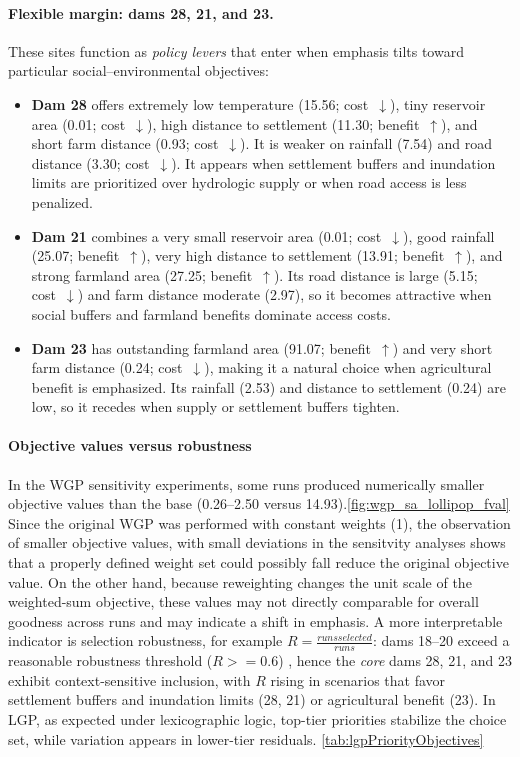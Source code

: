 \paragraph{Flexible margin: dams 28, 21, and 23.}
These sites function as \textit{policy levers} that enter when emphasis tilts toward particular social--environmental objectives:
\begin{itemize}
\item \textbf{Dam 28} offers extremely low temperature (15.56; cost~$\downarrow$), tiny reservoir area (0.01; cost~$\downarrow$), high distance to settlement (11.30; benefit~$\uparrow$), and short farm distance (0.93; cost~$\downarrow$). It is weaker on rainfall (7.54) and road distance (3.30; cost~$\downarrow$). It appears when settlement buffers and inundation limits are prioritized over hydrologic supply or when road access is less penalized.
\item \textbf{Dam 21} combines a very small reservoir area (0.01; cost~$\downarrow$), good rainfall (25.07; benefit~$\uparrow$), very high distance to settlement (13.91; benefit~$\uparrow$), and strong farmland area (27.25; benefit~$\uparrow$). Its road distance is large (5.15; cost~$\downarrow$) and farm distance moderate (2.97), so it becomes attractive when social buffers and farmland benefits dominate access costs.
\item \textbf{Dam 23} has outstanding farmland area (91.07; benefit~$\uparrow$) and very short farm distance (0.24; cost~$\downarrow$), making it a natural choice when agricultural benefit is emphasized. Its rainfall (2.53) and distance to settlement (0.24) are low, so it recedes when supply or settlement buffers tighten.
\end{itemize}

\paragraph{Objective values versus robustness}
In the WGP sensitivity experiments, some runs produced numerically smaller objective values than the base (0.26--2.50 versus 14.93).\ref{fig:wgp_sa_lollipop_fval} Since the original WGP was performed with constant weights (1), the observation of smaller objective values, with small deviations in the sensitvity analyses shows that a properly defined weight set could possibly fall reduce the original objective value. On the other hand, because reweighting changes the unit scale of the weighted-sum objective, these values may not directly comparable for overall goodness across runs and may indicate a shift in emphasis. A more interpretable indicator is selection robustness, for example $R = \frac{runs selected}{runs}$: dams 18--20 exceed a reasonable robustness threshold ($R >= 0.6$) , hence the \textit{core} dams 28, 21, and 23 exhibit context-sensitive inclusion, with $R$ rising in scenarios that favor settlement buffers and inundation limits (28, 21) or agricultural benefit (23). In LGP, as expected under lexicographic logic, top-tier priorities stabilize the choice set, while variation appears in lower-tier residuals. \ref{tab:lgpPriorityObjectives}

